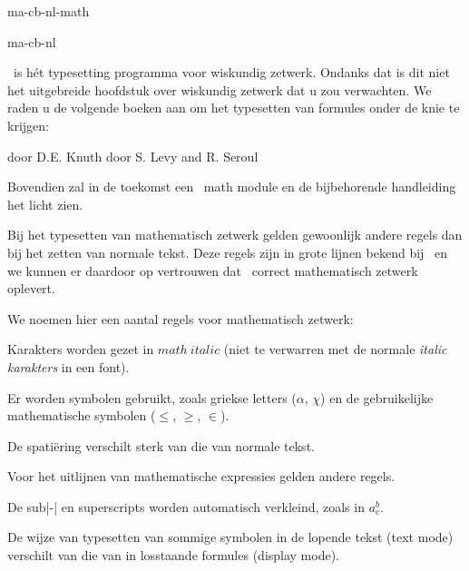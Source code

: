 \startonderdeel ma-cb-nl-math

\produkt ma-cb-nl




\TEX\ is h\'et typesetting programma voor wiskundig zetwerk.
Ondanks dat is dit niet het uitgebreide hoofdstuk over
wiskundig zetwerk dat u zou verwachten. We raden u de
volgende boeken aan om het typesetten van formules onder de
knie te krijgen:

\startopsomming[opelkaar]
 door D.E. Knuth
 door S. Levy and R. Seroul
\stopopsomming

Bovendien zal in de toekomst een \CONTEXT\ math module en de
bijbehorende handleiding het licht zien.




Bij het typesetten van mathematisch zetwerk gelden
gewoonlijk andere regels dan bij het zetten van normale
tekst. Deze regels zijn in grote lijnen bekend bij \TEX\ en
we kunnen er daardoor op vertrouwen dat \TEX\ correct
mathematisch zetwerk oplevert.

We noemen hier een aantal regels voor mathematisch zetwerk:

\startopsomming[n,opelkaar]

\som Karakters worden gezet in $math\ italic$ (niet te
     verwarren met de normale {\it italic karakters} in een
     font).

\som Er worden symbolen gebruikt, zoals griekse letters
     ($\alpha$, $\chi$) en de gebruikelijke mathematische
     symbolen ($\leq$, $\geq$, $\in$).

\som De spati\"ering verschilt sterk van die van normale
     tekst.

\som Voor het uitlijnen van mathematische expressies gelden
     andere regels.

\som De sub|-| en superscripts worden automatisch verkleind,
     zoals in $a^{b}_{c}$.

\som De wijze van typesetten van sommige symbolen in de
     lopende tekst (text mode) verschilt van die van
     in losstaande formules (display mode).


